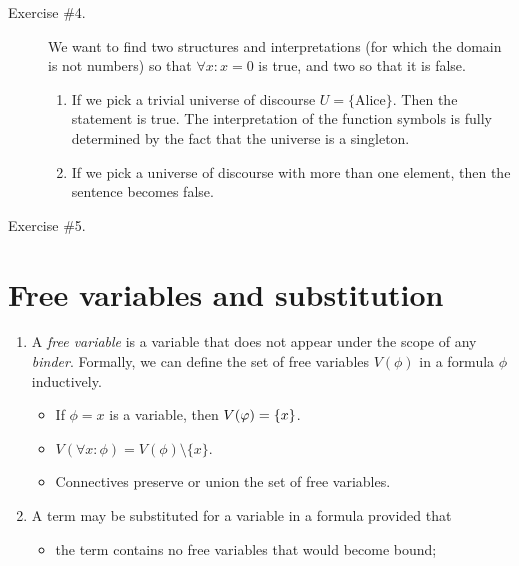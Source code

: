 \documentclass[11pt,letterpaper]{article}
\begin{document}
\begin{description}
  \item[Exercise \#4.]
    We want to find two structures and interpretations (for which the domain is
    not numbers) so that $\forall x: x = 0$ is true, and two so that it is
    false.

    \begin{enumerate}
      \item
        If we pick a trivial universe of discourse $U = \{\text{Alice}\}$.
        Then the statement is true.
        The interpretation of the function symbols is fully determined by the
        fact that the universe is a singleton.

      \item
        If we pick a universe of discourse with more than one element, then the
        sentence becomes false.
    \end{enumerate}

  \item[Exercise \#5.]

\end{description}

\section{Free variables and substitution}

\begin{enumerate}
  \item
    A \emph{free variable} is a variable that does not appear under the scope
    of any \emph{binder}.
    Formally, we can define the set of free variables $V(\phi)$ in a formula
    $\phi$ inductively.
    \begin{itemize}
      \item
        If $\phi = x$ is a variable, then $V(\varphi) = \left\{x\right\}$.

      \item
        $V(\forall x: \phi) = V(\phi) \setminus \{x\}$.

      \item
        Connectives preserve or union the set of free variables.
    \end{itemize}

  \item
    A term may be substituted for a variable in a formula provided that
    \begin{itemize}
      \item the term contains no free variables that would become bound;
    \end{itemize}
\end{enumerate}
\end{document}
